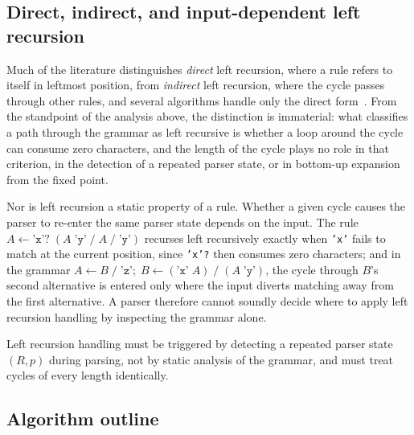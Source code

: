 \documentclass[manuscript]{acmart}
\newcommand{\cd}[1]{\texttt{#1}}
\begin{document}
\subsection{Direct, indirect, and input-dependent left recursion}
\label{sec:lrforms}

Much of the literature distinguishes \emph{direct} left recursion, where a rule refers to itself in leftmost position, from \emph{indirect} left recursion, where the cycle passes through other rules, and several algorithms handle only the direct form~\cite{tratt2010,parr2014}. From the standpoint of the analysis above, the distinction is immaterial: what classifies a path through the grammar as left recursive is whether a loop around the cycle can consume zero characters, and the length of the cycle plays no role in that criterion, in the detection of a repeated parser state, or in bottom-up expansion from the fixed point.

Nor is left recursion a static property of a rule. Whether a given cycle causes the parser to re-enter the same parser state depends on the input. The rule $A \leftarrow \texttt{'x'?} \; (A \; \texttt{'y'} \; / \; A \; / \; \texttt{'y'})$ recurses left recursively exactly when \cd{'x'} fails to match at the current position, since \cd{'x'?} then consumes zero characters; and in the grammar $A \leftarrow B \; / \; \texttt{'z'};\; B \leftarrow (\texttt{'x'} \; A) \; / \; (A \; \texttt{'y'})$, the cycle through $B$'s second alternative is entered only where the input diverts matching away from the first alternative. A parser therefore cannot soundly decide where to apply left recursion handling by inspecting the grammar alone.

\begin{lemma}
\label{lem:dynamic}
Left recursion handling must be triggered by detecting a repeated parser state $(R, p)$ during parsing, not by static analysis of the grammar, and must treat cycles of every length identically.
\end{lemma}

\subsection{Algorithm outline}
\label{sec:sketch}
\end{document}
